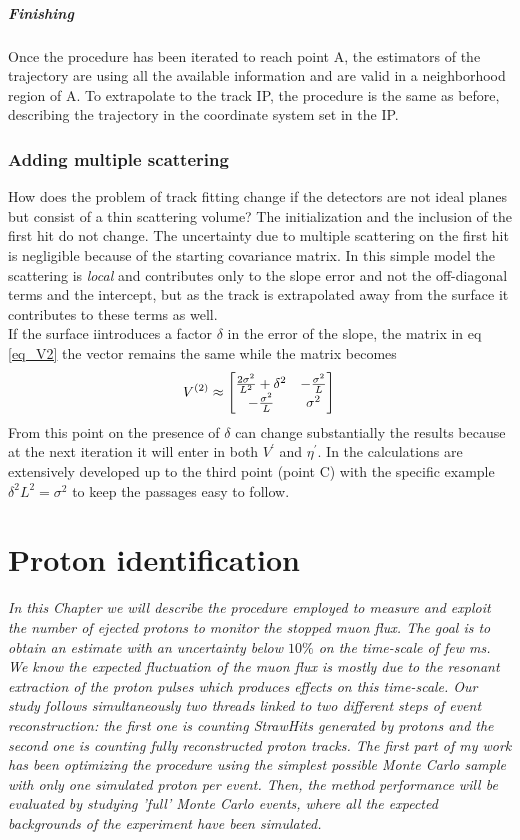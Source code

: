 \documentclass[12pt,a4paper,openright, oneside, titlepage]{book} %
\begin{document}
\paragraph{Finishing} Once the procedure has been iterated  to reach point A, 
the estimators of the trajectory are using all the available information and are valid in a neighborhood region of A. 
To extrapolate to the track IP, 
the procedure is the same as before, 
describing the trajectory in the coordinate system set in the IP. 

\subsection*{Adding multiple scattering}
How does the problem of track fitting change if the detectors are not ideal planes but consist of a thin scattering volume? 
The initialization and the inclusion of the first hit do not change. 
The uncertainty due to multiple scattering on the first hit is negligible because of the starting covariance matrix. 
In this simple model the scattering is \textit{local} and contributes only to the slope error and not the off-diagonal terms 
and the intercept, but as the track is extrapolated away from the surface it contributes to these terms as well.\\
If the surface iintroduces a factor $\delta$ in the error of the slope, 
the matrix in eq \ref{eq_V2} the vector remains the same while the matrix becomes
$$
V^{(2)}\approx
\begin{bmatrix}
\frac{2\sigma^2}{L^2}+\delta^2 & -\frac{\sigma^2}{L} \\
-\frac{\sigma^2}{L} & \sigma^2
\end{bmatrix}\\
$$
From this point on the presence of $\delta$ can change substantially the results because at the next iteration it will enter in both $V^\prime$ and $\eta^\prime$.
 In \cite{KutschkePaper} the calculations are extensively developed up to the third point (point C) 
 with the specific example $\delta^2L^2=\sigma^2$ to keep the passages easy to follow.

\chapter{Proton identification}
{\itshape In this Chapter we will describe the procedure employed to measure 
and exploit the number of ejected protons to monitor the stopped muon flux. 
The goal is to obtain an estimate with an uncertainty below $10\%$ on the time-scale of few ms. 
We know the expected fluctuation of the muon flux is mostly due to the resonant extraction of the proton pulses 
which produces effects on this time-scale. 
Our study follows simultaneously two threads  
linked to two different steps of event reconstruction: 
the first one is counting StrawHits generated by protons 
and the second one is counting fully reconstructed proton tracks. 
The first part of my work has been optimizing the procedure 
using the simplest possible Monte Carlo sample 
with only one simulated proton per event. 
Then, the method performance will be evaluated by studying 'full' Monte Carlo events, 
where all the expected backgrounds of the experiment have been simulated.}
\end{document}
